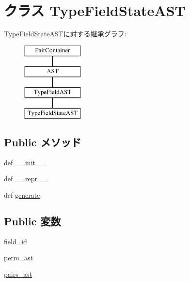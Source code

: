 \hypertarget{classslicc_1_1ast_1_1TypeFieldStateAST_1_1TypeFieldStateAST}{
\section{クラス TypeFieldStateAST}
\label{classslicc_1_1ast_1_1TypeFieldStateAST_1_1TypeFieldStateAST}
}
TypeFieldStateASTに対する継承グラフ:\begin{figure}[H]
\begin{center}
\leavevmode
\includegraphics[height=4cm]{classslicc_1_1ast_1_1TypeFieldStateAST_1_1TypeFieldStateAST}
\end{center}
\end{figure}
\subsection*{Public メソッド}
\begin{DoxyCompactItemize}
\item 
def \hyperlink{classslicc_1_1ast_1_1TypeFieldStateAST_1_1TypeFieldStateAST_ac775ee34451fdfa742b318538164070e}{\_\-\_\-init\_\-\_\-}
\item 
def \hyperlink{classslicc_1_1ast_1_1TypeFieldStateAST_1_1TypeFieldStateAST_ad8b9328939df072e4740cd9a63189744}{\_\-\_\-repr\_\-\_\-}
\item 
def \hyperlink{classslicc_1_1ast_1_1TypeFieldStateAST_1_1TypeFieldStateAST_a4555d1cee0dccf3942ea35fe86de2e8e}{generate}
\end{DoxyCompactItemize}
\subsection*{Public 変数}
\begin{DoxyCompactItemize}
\item 
\hyperlink{classslicc_1_1ast_1_1TypeFieldStateAST_1_1TypeFieldStateAST_a34ced61a2f2477f2d7a1279dac84ae9b}{field\_\-id}
\item 
\hyperlink{classslicc_1_1ast_1_1TypeFieldStateAST_1_1TypeFieldStateAST_aa5daf118d47a5a5e2baeebdf6833d549}{perm\_\-ast}
\item 
\hyperlink{classslicc_1_1ast_1_1TypeFieldStateAST_1_1TypeFieldStateAST_a03baf6f181cc885912d671c3fcbfd7e3}{pairs\_\-ast}
\end{DoxyCompactItemize}


